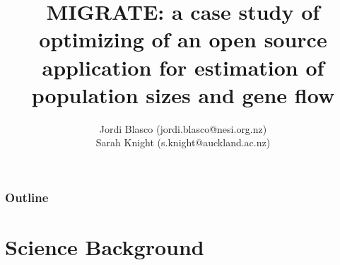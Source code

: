 \documentclass{beamer}
\title{MIGRATE: a case study of optimizing of an open source application for estimation of population sizes and gene flow}
\author{Jordi Blasco (jordi.blasco@nesi.org.nz)\\Sarah Knight (s.knight@auckland.ac.nz)}
\date{}
\newcommand\BackgroundPicture[1]{%
\setbeamertemplate{background}{%
\parbox[c][\paperheight]{\paperwidth}{%
\vfill \hfill \texttt{[image: \#1]}
\hfill \vfill
}}}
\begin{document}
{
\begin{frame}[plain]
\vspace{1cm}
\titlepage
\end{frame}
}

\begin{frame}
\frametitle{Outline}
\begin{multicols}{2}
   \tableofcontents
 \end{multicols}
 \end{frame}

\section{Science Background}
\end{document}
